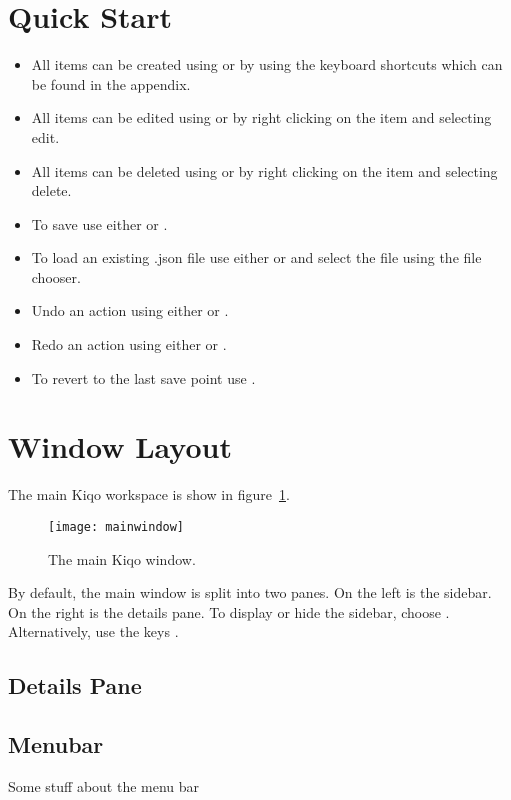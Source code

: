 \documentclass[11pt,fleqn]{book} %
\begin{document}
\section{Quick Start}
\begin{itemize}
    \item All items can be created using  or by using the keyboard shortcuts which can be found
    in the appendix.
    \item All items can be edited using  or by right clicking on the item and selecting edit.
    \item All items can be deleted using  or by right clicking on the item and selecting delete.
    \item To save use either  or .
    \item To load an existing .json file use either  or  and select the file using the file chooser.
    \item Undo an action using either  or .
    \item Redo an action using either  or .
    \item To revert to the last save point use .
\end{itemize}

\section{Window Layout}
The main Kiqo workspace is show in figure~\ref{fig:mainwindow}.

\begin{figure}[h]
  \centering
  \texttt{[image: mainwindow]}
  \caption{The main Kiqo window.\label{fig:mainwindow}}
\end{figure}

\noindent By default, the main window is split into two panes. On the left is the sidebar. On the right is the details pane.
To display or hide the sidebar, choose . Alternatively, use the keys .

\subsection{Details Pane}


\subsection{Menubar}
Some stuff about the menu bar
\end{document}
